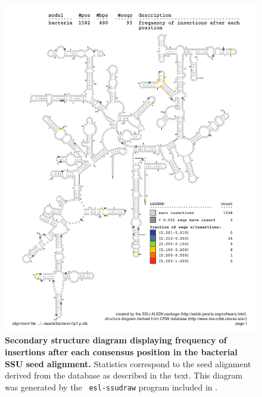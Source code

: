 \begin{figure}
\begin{center}
\includegraphics[width=5.7in]{Figures/bacteria-0p1-ifreq}
\end{center}
\caption[Secondary structure diagram displaying frequency of insertions
  after each consensus position in the bacterial SSU seed
  alignment]{\textbf{Secondary structure diagram displaying frequency
  of insertions after each consensus position in the bacterial SSU seed
  alignment.} Statistics correspond to the  seed
  alignment derived from the  database \cite{CannoneGutell02}
  as described in the text. This diagram was generated by the {\tt
  esl-ssudraw} program included in .}
\label{fig:bacins}
\end{figure}




